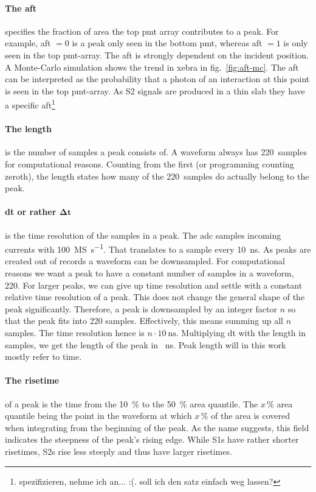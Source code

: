 \paragraph{The \gls{aft}} specifies the fraction of area the top \gls{pmt} array contributes to a peak.
For example, \gls{aft} $ = 0 $ is a peak only seen in the bottom \gls{pmt}, whereas \gls{aft} $ = 1 $ is only seen in the top \gls{pmt}-array.
The \gls{aft} is strongly dependent on the incident position.
A Monte-Carlo simulation shows the trend in \gls{xebra} in fig.~\ref{fig:aft-mc}. %
The \gls{aft} can be interpreted as the probability that a photon of an interaction at this point is seen in the top \gls{pmt}-array.
As S2 signals are produced in a thin slab they have a specific \gls{aft}\footnote{spezifizieren, nehme ich an... :(. soll ich den satz einfach weg lassen?}

\paragraph{The length} is the number of samples a peak consists of.
A waveform always has \SI{220}{samples} for computational reasons.
Counting from the first (or programming counting zeroth), the length states how many of the \SI{220}{samples} do actually belong to the peak.

\paragraph{dt or rather $ \mathbf{\Delta t}$} is the time resolution of the samples in a peak.
The \gls{adc} samples incoming currents with \SI{100}{\mega S\per\second}.
That translates to a sample every \SI{10}{\nano\second}.
As peaks are created out of records a waveform can be downsampled.
For computational reasons we want a peak to have a constant number of samples in a waveform, 220.
For larger peaks, we can give up time resolution and settle with a constant relative time resolution of a peak.
This does not change the general shape of the peak significantly.
Therefore, a peak is downsampled by an integer factor $ n $ so that the peak fits into 220 samples.
Effectively, this means summing up all $ n $ samples.
The time resolution hence is $ n \cdot \SI{10}{\nano\second} $.
Multiplying dt with the length in samples, we get the length of the peak in \SI{}{\nano\second}.
Peak length will in this work mostly refer to time.

\paragraph{The risetime} of a peak is the time from the \SI{10}{\%} to the \SI{50}{\%} area quantile.
The $ x\,\% $ area quantile being the point in the waveform at which $ x\,\% $ of the area is covered when integrating from the beginning of the peak.
As the name suggests, this field indicates the steepness of the peak's rising edge.
While S1s have rather shorter risetimes, S2s rise less steeply and thus have larger risetimes.

